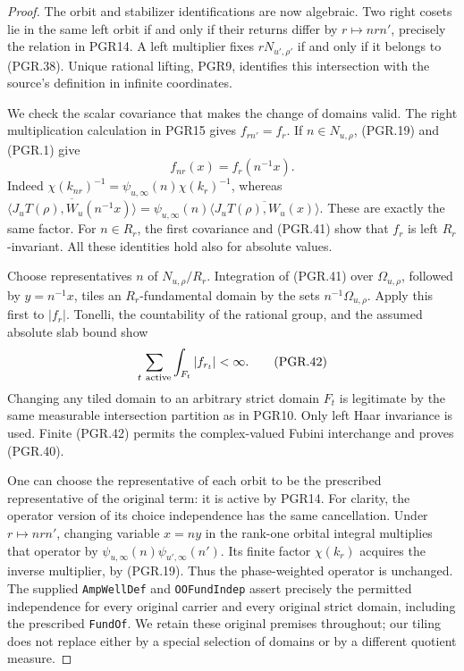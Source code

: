 \documentclass[11pt,a4paper]{article}
\numberwithin{equation}{section}
\theoremstyle{remark}\newtheorem{remark}[theorem]{Remark}
\begin{document}
\begin{proof}
The orbit and stabilizer identifications are now algebraic.
Two right cosets lie in the same left orbit if and only if
their returns differ by \(r\mapsto n r n'\), precisely the
relation in PGR14.  A left multiplier fixes \(rN_{u',\rho'}\)
if and only if it belongs to (PGR.38).  Unique rational lifting,
PGR9, identifies this intersection with the source's definition in
infinite coordinates.

We check the scalar covariance that makes the change of domains valid.
The right multiplication calculation in PGR15 gives
\(f_{rn'}=f_r\).  If \(n\in N_{u,\rho}\), (PGR.19)
and (PGR.1) give
\[
                  f_{nr}(x)=f_r(n^{-1}x).
\tag{PGR.41}
\]
Indeed \(\chi(k_{nr})^{-1}=\psi_{u,\infty}(n)
\chi(k_r)^{-1}\), whereas
\(\overline{\langle J_uT(\rho),W_u(n^{-1}x)\rangle}
=\psi_{u,\infty}(n)
\overline{\langle J_uT(\rho),W_u(x)\rangle}\).
These are exactly the same factor.  For \(n\in R_r\), the
first covariance and (PGR.41) show that \(f_r\) is left
\(R_r\)-invariant.  All these identities hold also for absolute
values.

Choose representatives \(n\) of \(N_{u,\rho}/R_r\).
Integration of (PGR.41) over \(\Omega_{u,\rho}\), followed by
\(y=n^{-1}x\), tiles an \(R_r\)-fundamental domain by the
sets \(n^{-1}\Omega_{u,\rho}\).  Apply this first to
\(|f_r|\).  Tonelli, the countability of the rational group, and
the assumed absolute slab bound show
\[
 \sum_{t\ {\rm active}}\int_{F_t}|f_{r_t}|<\infty.
\tag{PGR.42}
\]
Changing any tiled domain to an arbitrary strict domain \(F_t\)
is legitimate by the same measurable intersection partition as in
PGR10.  Only left Haar invariance is used.  Finite (PGR.42) permits
the complex-valued Fubini interchange and proves (PGR.40).

One can choose the representative of each orbit to be the prescribed
representative of the original term: it is active by PGR14.
For clarity, the operator version of its choice independence has the
same cancellation.  Under \(r\mapsto n r n'\), changing
variable \(x=ny\) in the rank-one orbital integral multiplies
that operator by
\(\psi_{u,\infty}(n)\psi_{u',\infty}(n')\).
Its finite factor \(\chi(k_r)\) acquires the inverse multiplier,
by (PGR.19).  Thus the phase-weighted operator is unchanged.
The supplied \texttt{Amp\allowbreak Well\allowbreak Def} and \texttt{OOFund\allowbreak Indep}
assert precisely the permitted independence for every original
carrier and every original strict domain, including the prescribed
\texttt{Fund\allowbreak Of}.  We retain these original premises throughout;
our tiling does not replace either by a special selection of domains
or by a different quotient measure.
\end{proof}
\end{document}

